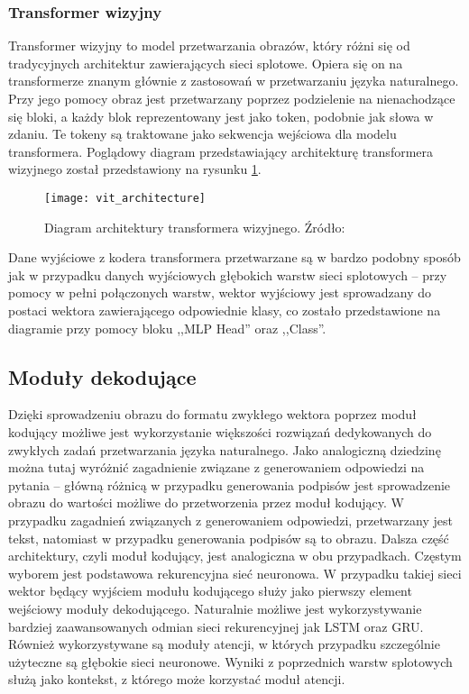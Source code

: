 \subsubsection{Transformer wizyjny}
Transformer wizyjny \cite{vit} to model przetwarzania obrazów, który różni się od tradycyjnych architektur zawierających sieci splotowe. Opiera się on na transformerze znanym głównie z zastosowań w przetwarzaniu języka naturalnego. Przy jego pomocy obraz jest przetwarzany poprzez podzielenie na nienachodzące się bloki, a każdy blok reprezentowany jest jako token, podobnie jak słowa w zdaniu. Te tokeny są traktowane jako sekwencja wejściowa dla modelu transformera. Poglądowy diagram przedstawiający architekturę transformera wizyjnego został przedstawiony na rysunku \ref{fig:vit-architecture}.
\begin{figure}[H]
  \centering
  \texttt{[image: vit\_architecture]}
  \caption{Diagram architektury transformera wizyjnego. Źródło: \cite{vit}}
  \label{fig:vit-architecture}
\end{figure}
\noindent Dane wyjściowe z kodera transformera przetwarzane są w bardzo podobny sposób jak w przypadku danych wyjściowych głębokich warstw sieci splotowych -- przy pomocy w pełni połączonych warstw, wektor wyjściowy jest sprowadzany do postaci wektora zawierającego odpowiednie klasy, co zostało przedstawione na diagramie przy pomocy bloku ,,MLP Head'' oraz ,,Class''.
\subsection{Moduły dekodujące}
Dzięki sprowadzeniu obrazu do formatu zwykłego wektora poprzez moduł kodujący możliwe jest wykorzystanie większości rozwiązań dedykowanych do zwykłych zadań przetwarzania języka naturalnego. Jako analogiczną dziedzinę można tutaj wyróżnić zagadnienie związane z generowaniem odpowiedzi na pytania -- główną różnicą w przypadku generowania podpisów jest sprowadzenie obrazu do wartości możliwe do przetworzenia przez moduł kodujący. W przypadku zagadnień związanych z generowaniem odpowiedzi, przetwarzany jest tekst, natomiast w przypadku generowania podpisów są to obrazu. Dalsza część architektury, czyli moduł kodujący, jest analogiczna w obu przypadkach. Częstym wyborem jest podstawowa rekurencyjna sieć neuronowa. W przypadku takiej sieci wektor będący wyjściem modułu kodującego służy jako pierwszy element wejściowy moduły dekodującego. Naturalnie możliwe jest wykorzystywanie bardziej zaawansowanych odmian sieci rekurencyjnej jak LSTM oraz GRU. Również wykorzystywane są moduły atencji, w których przypadku szczególnie użyteczne są głębokie sieci neuronowe. Wyniki z poprzednich warstw splotowych służą jako kontekst, z którego może korzystać moduł atencji.
